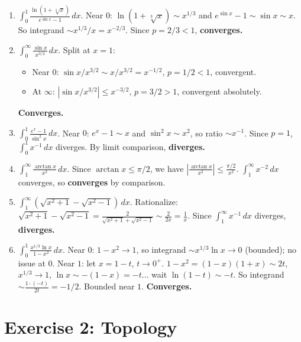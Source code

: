 \documentclass[12pt,a4paper]{article}
\begin{document}
\begin{enumerate}[leftmargin=*, label=(\alph*)]
\item $\int_0^1\frac{\ln(1+\sqrt[3]{x})}{e^{\sin x}-1}\,dx$. Near $0$: $\ln(1+\sqrt[3]{x})\sim x^{1/3}$ and $e^{\sin x}-1\sim\sin x\sim x$.
So integrand $\sim x^{1/3}/x=x^{-2/3}$. Since $p=2/3<1$, \textbf{converges.}

\item $\int_0^\infty\frac{\sin x}{x^{3/2}}\,dx$. Split at $x=1$:
\begin{itemize}
\item Near $0$: $\sin x/x^{3/2}\sim x/x^{3/2}=x^{-1/2}$, $p=1/2<1$, convergent.
\item At $\infty$: $|\sin x/x^{3/2}|\le x^{-3/2}$, $p=3/2>1$, convergent absolutely.
\end{itemize}
\textbf{Converges.}

\item $\int_0^1\frac{e^x-1}{\sin^2 x}\,dx$. Near $0$: $e^x-1\sim x$ and $\sin^2 x\sim x^2$, so ratio $\sim x^{-1}$. Since $p=1$, $\int_0^1 x^{-1}\,dx$ diverges. By limit comparison, \textbf{diverges.}

\item $\int_1^\infty\frac{\arctan x}{x^2}\,dx$. Since $\arctan x\le\pi/2$, we have $\left|\frac{\arctan x}{x^2}\right|\le\frac{\pi/2}{x^2}$. $\int_1^\infty x^{-2}\,dx$ converges, so \textbf{converges} by comparison.

\item $\int_1^\infty(\sqrt{x^2+1}-\sqrt{x^2-1})\,dx$. Rationalize:
$\sqrt{x^2+1}-\sqrt{x^2-1}=\frac{2}{\sqrt{x^2+1}+\sqrt{x^2-1}}\sim\frac{2}{2x}=\frac{1}{x}$.
Since $\int_1^\infty x^{-1}\,dx$ diverges, \textbf{diverges.}

\item $\int_0^1\frac{x^{1/3}\ln x}{1-x^2}\,dx$. Near $0$: $1-x^2\to 1$, so integrand $\sim x^{1/3}\ln x\to 0$ (bounded); no issue at $0$.
Near $1$: let $x=1-t$, $t\to 0^+$. $1-x^2=(1-x)(1+x)\sim 2t$, $x^{1/3}\to 1$, $\ln x\sim -(1-x)=-t$... wait $\ln(1-t)\sim -t$. So integrand $\sim\frac{1\cdot(-t)}{2t}=-1/2$. Bounded near $1$. \textbf{Converges.}

\end{enumerate}

\section*{Exercise 2: Topology}
\end{document}
